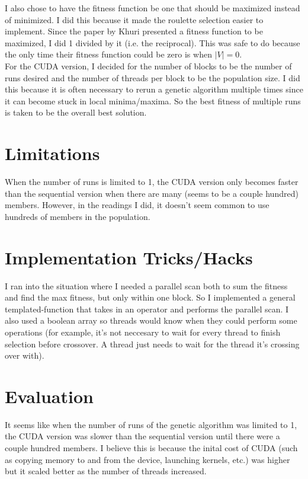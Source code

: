 \documentclass[9pt]{article}
\begin{document}
I also chose to have the fitness function be one that should be maximized instead of minimized. I did this because it made the roulette selection easier to implement. Since the paper by Khuri presented a fitness function to be maximized, I did 1 divided by it (i.e. the reciprocal). This was safe to do because the only time their fitness function could be zero is when $|V| = 0$.\\

For the CUDA version, I decided for the number of blocks to be the number of runs desired and the number of threads per block to be the population size. I did this because it is often necessary to rerun a genetic algorithm multiple times since it can become stuck in local minima/maxima. So the best fitness of multiple runs is taken to be the overall best solution.

\section{Limitations}
When the number of runs is limited to 1, the CUDA version only becomes faster than the sequential version when there are many (seems to be a couple hundred) members. However, in the readings I did, it doesn't seem common to use hundreds of members in the population.

\section{Implementation Tricks/Hacks}
I ran into the situation where I needed a parallel scan both to sum the fitness and find the max fitness, but only within one block. So I implemented a general templated-function that takes in an operator and performs the parallel scan. I also used a boolean array so threads would know when they could perform some operations (for example, it's not neccesary to wait for every thread to finish selection before crossover. A thread just needs to wait for the thread it's crossing over with).

\section{Evaluation}
It seems like when the number of runs of the genetic algorithm was limited to 1, the CUDA version was slower than the sequential version until there were a couple hundred members. I believe this is because the inital cost of CUDA (such as copying memory to and from the device, launching kernels, etc.) was higher but it scaled better as the number of threads increased.\\
\end{document}
